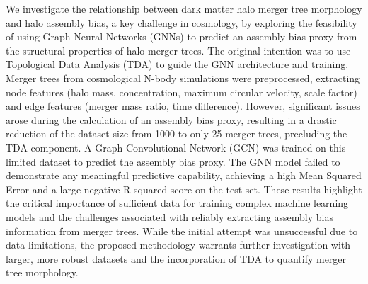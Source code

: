\documentclass[twocolumn]{aastex631}
\begin{document}
We investigate the relationship between dark matter halo merger tree morphology and halo assembly bias, a key challenge in cosmology, by exploring the feasibility of using Graph Neural Networks (GNNs) to predict an assembly bias proxy from the structural properties of halo merger trees. The original intention was to use Topological Data Analysis (TDA) to guide the GNN architecture and training. Merger trees from cosmological N-body simulations were preprocessed, extracting node features (halo mass, concentration, maximum circular velocity, scale factor) and edge features (merger mass ratio, time difference). However, significant issues arose during the calculation of an assembly bias proxy, resulting in a drastic reduction of the dataset size from 1000 to only 25 merger trees, precluding the TDA component. A Graph Convolutional Network (GCN) was trained on this limited dataset to predict the assembly bias proxy. The GNN model failed to demonstrate any meaningful predictive capability, achieving a high Mean Squared Error and a large negative R-squared score on the test set. These results highlight the critical importance of sufficient data for training complex machine learning models and the challenges associated with reliably extracting assembly bias information from merger trees. While the initial attempt was unsuccessful due to data limitations, the proposed methodology warrants further investigation with larger, more robust datasets and the incorporation of TDA to quantify merger tree morphology.
\end{document}
